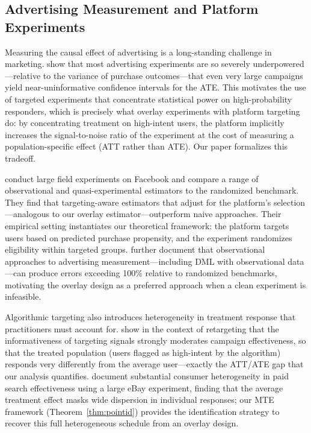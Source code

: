 \documentclass[12pt]{article}
\begin{document}
\subsection*{Advertising Measurement and Platform Experiments}

Measuring the causal effect of advertising is a long-standing challenge
in marketing. \citet{lewis2015unfavorable} show that most advertising
experiments are so severely underpowered---relative to the variance of
purchase outcomes---that even very large campaigns yield near-uninformative
confidence intervals for the ATE. This motivates the use of targeted
experiments that concentrate statistical power on high-probability responders,
which is precisely what overlay experiments with platform targeting do:
by concentrating treatment on high-intent users, the platform implicitly
increases the signal-to-noise ratio of the experiment at the cost of
measuring a population-specific effect (ATT rather than ATE). Our paper
formalizes this tradeoff.

\citet{gordon2019comparison} conduct large field experiments on Facebook
and compare a range of observational and quasi-experimental estimators
to the randomized benchmark. They find that targeting-aware estimators
that adjust for the platform's selection---analogous to our overlay
estimator---outperform naive approaches. Their empirical setting
instantiates our theoretical framework: the platform targets users based
on predicted purchase propensity, and the experiment randomizes eligibility
within targeted groups. \citet{gordon2023close} further document that
observational approaches to advertising measurement---including DML
with observational data---can produce errors exceeding 100\% relative to
randomized benchmarks, motivating the overlay design as a preferred
approach when a clean experiment is infeasible.

Algorithmic targeting also introduces heterogeneity in treatment response
that practitioners must account for. \citet{lambrecht2013does} show
in the context of retargeting that the informativeness of targeting signals
strongly moderates campaign effectiveness, so that the treated population
(users flagged as high-intent by the algorithm) responds very differently
from the average user---exactly the ATT/ATE gap that our analysis quantifies.
\citet{blake2015consumer} document substantial consumer heterogeneity in
paid search effectiveness using a large eBay experiment, finding that
the average treatment effect masks wide dispersion in individual responses;
our MTE framework (Theorem~\ref{thm:pointid}) provides the identification
strategy to recover this full heterogeneous schedule from an overlay design.
\end{document}
